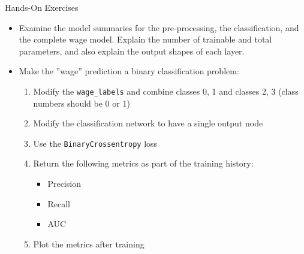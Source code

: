 \documentclass[ignorenonframetext,xcolor=x11names]{beamer}
\begin{document}
\begin{frame}{Hands-On Exercises}
\begin{itemize}
   \item Examine the model summaries for the pre-processing, the classification, and the complete wage model. Explain the number of trainable and total parameters, and also explain the output shapes of each layer.
   \item Make the ''wage'' prediction a binary classification problem:
   \begin{enumerate}
      \item Modify the \texttt{wage\_labels} and combine classes 0, 1 and classes 2, 3 (class numbers should be 0 or 1)
      \item Modify the classification network to have a single output node
      \item Use the \texttt{BinaryCrossentropy} loss
      \item Return the following metrics as part of the training history:
      \begin{itemize}
          \item Precision
          \item Recall
          \item AUC
      \end{itemize}
      \item Plot the metrics after training
   \end{enumerate}
\end{itemize}
\end{frame}
\end{document}
